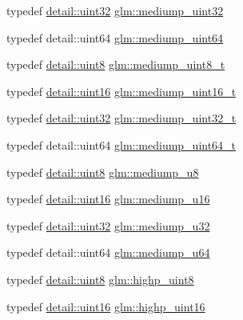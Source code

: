 \begin{DoxyCompactItemize}
\item 
typedef \hyperlink{stb__image_8c_a1134b580f8da4de94ca6b1de4d37975e}{detail\+::uint32} \hyperlink{group__gtc__type__precision_ga861dbd1051f488e425b3966001b568e5}{glm\+::mediump\+\_\+uint32}
\item 
typedef detail\+::uint64 \hyperlink{group__gtc__type__precision_ga6685788d15d0a973ee7c2460d0456dc1}{glm\+::mediump\+\_\+uint64}
\item 
typedef \hyperlink{stb__image_8c_adde6aaee8457bee49c2a92621fe22b79}{detail\+::uint8} \hyperlink{group__gtc__type__precision_gadfa38f3c245d371c4b2079f1fd68928b}{glm\+::mediump\+\_\+uint8\+\_\+t}
\item 
typedef \hyperlink{stb__image_8c_a05f6b0ae8f6a6e135b0e290c25fe0e4e}{detail\+::uint16} \hyperlink{group__gtc__type__precision_ga0b385466deac5ac96061ef2cdd6db20f}{glm\+::mediump\+\_\+uint16\+\_\+t}
\item 
typedef \hyperlink{stb__image_8c_a1134b580f8da4de94ca6b1de4d37975e}{detail\+::uint32} \hyperlink{group__gtc__type__precision_gac7782c1e393f9ad47e41a177a685f287}{glm\+::mediump\+\_\+uint32\+\_\+t}
\item 
typedef detail\+::uint64 \hyperlink{group__gtc__type__precision_gaa97354d3120a6dc029a5e9563723de18}{glm\+::mediump\+\_\+uint64\+\_\+t}
\item 
typedef \hyperlink{stb__image_8c_adde6aaee8457bee49c2a92621fe22b79}{detail\+::uint8} \hyperlink{group__gtc__type__precision_gac04b372784392e82bd557f300c4de097}{glm\+::mediump\+\_\+u8}
\item 
typedef \hyperlink{stb__image_8c_a05f6b0ae8f6a6e135b0e290c25fe0e4e}{detail\+::uint16} \hyperlink{group__gtc__type__precision_ga6745262ef6a6fdb8637b2387ef924828}{glm\+::mediump\+\_\+u16}
\item 
typedef \hyperlink{stb__image_8c_a1134b580f8da4de94ca6b1de4d37975e}{detail\+::uint32} \hyperlink{group__gtc__type__precision_gad0c27a525045c299a92306eb4cd7c13a}{glm\+::mediump\+\_\+u32}
\item 
typedef detail\+::uint64 \hyperlink{group__gtc__type__precision_ga00c51a16fa190b0a90205d50d6d8a44a}{glm\+::mediump\+\_\+u64}
\item 
typedef \hyperlink{stb__image_8c_adde6aaee8457bee49c2a92621fe22b79}{detail\+::uint8} \hyperlink{group__gtc__type__precision_ga2c27c6dd26e893786f04b10f99c1ee95}{glm\+::highp\+\_\+uint8}
\item 
typedef \hyperlink{stb__image_8c_a05f6b0ae8f6a6e135b0e290c25fe0e4e}{detail\+::uint16} \hyperlink{group__gtc__type__precision_ga4d32967d45ba8365e2a05eaaac85e978}{glm\+::highp\+\_\+uint16}

\end{DoxyCompactItemize}
